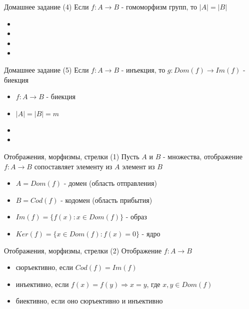 \documentclass{beamer}
\begin{document}
\begin{frame}{Домашнее задание (4)}
Если $f : A \to B$ - гомоморфизм групп, то $\left\vert{A}\right\vert = \left\vert{B}\right\vert$ 
  \begin{itemize}
    \item 
    \item 
    \item 
    \item 
  \end{itemize}  
\end{frame}

\begin{frame}{Домашнее задание (5)}
Если $f : A \to B$ - инъекция, то $g: Dom(f) \to Im(f)$ - биекция\\
  \begin{itemize}
    \item $f : A \to B$ - биекция
    \item $\left\vert{A}\right\vert = \left\vert{B}\right\vert = m$
    \item 
    \item 
  \end{itemize}  
\end{frame}


\begin{frame}{Отображения, морфизмы, стрелки (1)}
Пусть $A$ и $B$ - множества, отображение $f : A \to B$ сопоставляет элементу из $A$ элемент из $B$\\
  \begin{itemize}
    \item $A = Dom(f)$ - домен (область отправления)
    \item $B = Cod(f)$ - кодомен (область прибытия) 
    \item $Im(f) = \{f(x) : x \in Dom(f)\}$ - образ 
    \item $Ker(f) = \{x \in Dom(f) : f(x) = 0\}$ - ядро 
  \end{itemize}
\end{frame}

\begin{frame}{Отображения, морфизмы, стрелки (2)}
Отображение $f : A \to B$
  \begin{itemize}
    \item сюръективно, если $Cod(f) = Im(f)$
    \item инъективно, если $f(x) = f(y) \Rightarrow x = y$, где $x, y \in Dom(f)$
    \item биективно, если оно сюръективно и инъективно
  \end{itemize}
\end{frame}
\end{document}
